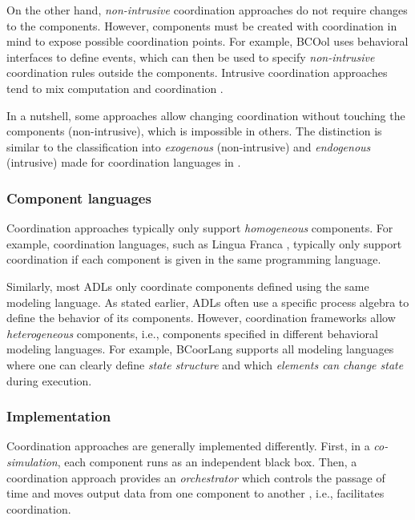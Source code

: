 \documentclass[runningheads]{llncs}
\begin{document}
On the other hand, \textit{non-intrusive} coordination approaches do not require changes to the components.
However, components must be created with coordination in mind to expose possible coordination points.
For example, BCOol \cite{varalarsenBehavioralCoordinationOperator2015} uses behavioral interfaces to define events, which can then be used to specify \textit{non-intrusive} coordination rules outside the components.
Intrusive coordination approaches tend to mix computation and coordination \cite{arbabWhatYouMean1998}.

In a nutshell, some approaches allow changing coordination without touching the components (non-intrusive), which is impossible in others.
The distinction is similar to the classification into \textit{exogenous} (non-intrusive) and \textit{endogenous} (intrusive) made for coordination languages in \cite{arbabWhatYouMean1998}.

\subsubsection{Component languages} Coordination approaches typically only support \textit{homogeneous} components.
For example, coordination languages, such as Lingua Franca \cite{lohstrohReactorsDeterministicModel2020}, typically only support coordination if each component is given in the same programming language.

Similarly, most ADLs only coordinate components defined using the same modeling language.
As stated earlier, ADLs often use a specific process algebra to define the behavior of its components.
However, coordination frameworks allow \textit{heterogeneous} components, i.e., components specified in different behavioral modeling languages.
For example, BCoorLang \cite{krauterBehavioralConsistencyMultimodeling2023} supports all modeling languages where one can clearly define \textit{state structure} and which \textit{elements can change state} during execution.

\subsubsection{Implementation} Coordination approaches are generally implemented differently.
First, in a \textit{co-simulation}, each component runs as an independent black box.
Then, a coordination approach provides an \textit{orchestrator} which controls the passage of time and moves output data from one component to another \cite{gomesCoSimulationSurvey2019}, i.e., facilitates coordination.
\end{document}
